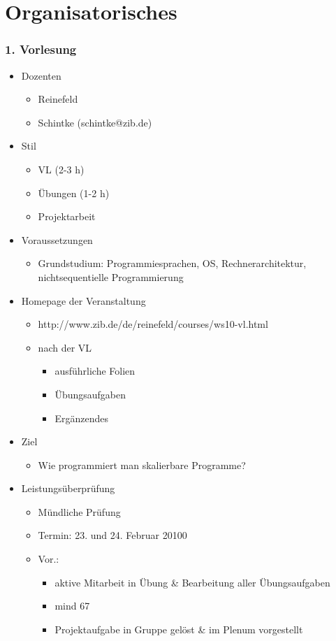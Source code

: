 \part{Organisatorisches}
\section{1. Vorlesung}
\begin{itemize}
	\item Dozenten
		\begin{itemize}
			\item  Reinefeld
			\item Schintke (schintke@zib.de)
		\end{itemize}
	\item Stil
		\begin{itemize}
			\item VL (2-3 h)
			\item Übungen (1-2 h)
			\item Projektarbeit
		\end{itemize}
	\item Voraussetzungen
		\begin{itemize}
			\item Grundstudium: Programmiesprachen, OS, Rechnerarchitektur, nichtsequentielle Programmierung
		\end{itemize}
	\item Homepage der Veranstaltung
		\begin{itemize}
			\item http://www.zib.de/de/reinefeld/courses/ws10-vl.html
			\item nach der VL
				\begin{itemize}
					\item ausführliche Folien
					\item Übungsaufgaben
					\item Ergänzendes
				\end{itemize}
		\end{itemize}
	\item Ziel
		\begin{itemize}
			\item Wie programmiert man skalierbare Programme?
		\end{itemize}
	\item Leistungsüberprüfung
		\begin{itemize}
			\item Mündliche Prüfung
			\item Termin: 23. und 24. Februar 20100
			\item Vor.:
				\begin{itemize}
					\item aktive Mitarbeit in Übung \& Bearbeitung aller Übungsaufgaben
					\item mind 67%
					\item Projektaufgabe in Gruppe gelöst \& im Plenum vorgestellt
				\end{itemize}
		\end{itemize}
\end{itemize}

